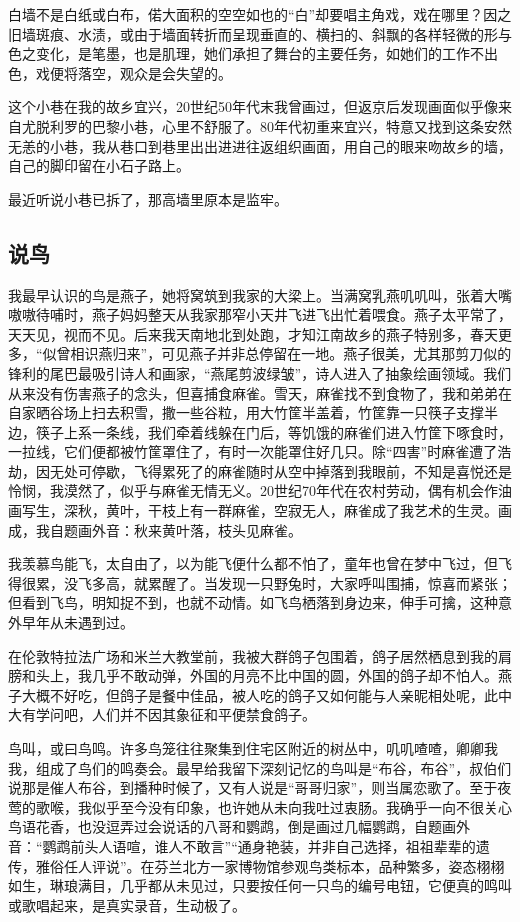 \documentclass{article}
\begin{document}
白墙不是白纸或白布，偌大面积的空空如也的“白”却要唱主角戏，戏在哪里？因之旧墙斑痕、水渍，或由于墙面转折而呈现垂直的、横扫的、斜飘的各样轻微的形与色之变化，是笔墨，也是肌理，她们承担了舞台的主要任务，如她们的工作不出色，戏便将落空，观众是会失望的。

这个小巷在我的故乡宜兴，20世纪50年代末我曾画过，但返京后发现画面似乎像来自尤脱利罗的巴黎小巷，心里不舒服了。80年代初重来宜兴，特意又找到这条安然无恙的小巷，我从巷口到巷里出出进进往返组织画面，用自己的眼来吻故乡的墙，自己的脚印留在小石子路上。

最近听说小巷已拆了，那高墙里原本是监牢。
\subsection{说鸟}
我最早认识的鸟是燕子，她将窝筑到我家的大梁上。当满窝乳燕叽叽叫，张着大嘴嗷嗷待哺时，燕子妈妈整天从我家那窄小天井飞进飞出忙着喂食。燕子太平常了，天天见，视而不见。后来我天南地北到处跑，才知江南故乡的燕子特别多，春天更多，“似曾相识燕归来”，可见燕子并非总停留在一地。燕子很美，尤其那剪刀似的锋利的尾巴最吸引诗人和画家，“燕尾剪波绿皱”，诗人进入了抽象绘画领域。我们从来没有伤害燕子的念头，但喜捕食麻雀。雪天，麻雀找不到食物了，我和弟弟在自家晒谷场上扫去积雪，撒一些谷粒，用大竹筐半盖着，竹筐靠一只筷子支撑半边，筷子上系一条线，我们牵着线躲在门后，等饥饿的麻雀们进入竹筐下啄食时，一拉线，它们便都被竹筐罩住了，有时一次能罩住好几只。除“四害”时麻雀遭了浩劫，因无处可停歇，飞得累死了的麻雀随时从空中掉落到我眼前，不知是喜悦还是怜悯，我漠然了，似乎与麻雀无情无义。20世纪70年代在农村劳动，偶有机会作油画写生，深秋，黄叶，干枝上有一群麻雀，空寂无人，麻雀成了我艺术的生灵。画成，我自题画外音：秋来黄叶落，枝头见麻雀。

我羡慕鸟能飞，太自由了，以为能飞便什么都不怕了，童年也曾在梦中飞过，但飞得很累，没飞多高，就累醒了。当发现一只野兔时，大家呼叫围捕，惊喜而紧张；但看到飞鸟，明知捉不到，也就不动情。如飞鸟栖落到身边来，伸手可擒，这种意外早年从未遇到过。

在伦敦特拉法广场和米兰大教堂前，我被大群鸽子包围着，鸽子居然栖息到我的肩膀和头上，我几乎不敢动弹，外国的月亮不比中国的圆，外国的鸽子却不怕人。燕子大概不好吃，但鸽子是餐中佳品，被人吃的鸽子又如何能与人亲昵相处呢，此中大有学问吧，人们并不因其象征和平便禁食鸽子。

鸟叫，或曰鸟鸣。许多鸟笼往往聚集到住宅区附近的树丛中，叽叽喳喳，卿卿我我，组成了鸟们的鸣奏会。最早给我留下深刻记忆的鸟叫是“布谷，布谷”，叔伯们说那是催人布谷，到播种时候了，又有人说是“哥哥归家”，则当属恋歌了。至于夜莺的歌喉，我似乎至今没有印象，也许她从未向我吐过衷肠。我确乎一向不很关心鸟语花香，也没逗弄过会说话的八哥和鹦鹉，倒是画过几幅鹦鹉，自题画外音：“鹦鹉前头人语喧，谁人不敢言”“通身艳装，并非自己选择，祖祖辈辈的遗传，雅俗任人评说”。在芬兰北方一家博物馆参观鸟类标本，品种繁多，姿态栩栩如生，琳琅满目，几乎都从未见过，只要按任何一只鸟的编号电钮，它便真的鸣叫或歌唱起来，是真实录音，生动极了。
\end{document}
